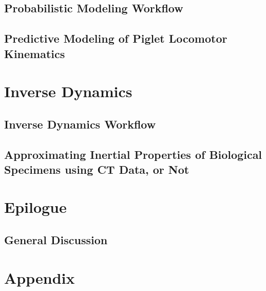 \documentclass[12pt,a4paper,twoside]{report}
\newcommand\cleartoleftpage{
\ifodd\value{page}\hbox{}\clearpage\else\hbox{}\fi
}
\newcommand\cleartorightpage{
\ifodd\value{page}\hbox{}\clearpage\else\hbox{}\cleardoublepage\fi
\hbox{}
}
\begin{document}
\cleartoleftpage
\chapter{Probabilistic Modeling Workflow}\label{cpt:statistics}


\cleartoleftpage
\chapter{Predictive Modeling of Piglet Locomotor Kinematics}\label{cpt:piglets}




\cleartorightpage
\part{Inverse Dynamics}\label{pt:3}

\cleartoleftpage
\chapter{Inverse Dynamics Workflow}\label{cpt:dynamics_workflow}


\cleartoleftpage
\chapter[Inertial Properties]{Approximating Inertial Properties of Biological Specimens using CT Data, or Not}\label{cpt:inertials}




\clearpage
\part{Epilogue}

\cleartoleftpage
\chapter{General Discussion}\label{cpt:generaldiscussion}
\clearpage




\cleartorightpage
\part{Appendix}\label{appendix}

\addtocounter{chapter}{+1}
\setcounter{section}{0}
\end{document}
